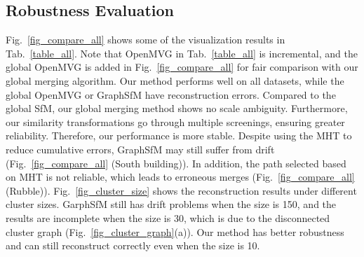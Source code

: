 \documentclass[runningheads]{llncs}
\begin{document}
 





\subsection{Robustness Evaluation}
Fig.~\ref{fig_compare_all} shows some of the visualization results in Tab.~\ref{table_all}. Note that OpenMVG in Tab.~\ref{table_all} is incremental, and the global OpenMVG is added in Fig.~\ref{fig_compare_all} for fair comparison with our global merging algorithm. Our method performs well on all datasets, while the global OpenMVG or GraphSfM have reconstruction errors. Compared to the global SfM, our global merging method shows no scale ambiguity. Furthermore, our similarity transformations go through multiple screenings, ensuring greater reliability. Therefore, our performance is more stable. Despite using the MHT to reduce cumulative errors, GraphSfM may still suffer from drift (Fig.~\ref{fig_compare_all} (South building)). In addition, the path selected based on MHT is not reliable, which leads to erroneous merges (Fig.~\ref{fig_compare_all} (Rubble)). Fig.~\ref{fig_cluster_size} shows the reconstruction results under different cluster sizes. GarphSfM still has drift problems when the size is 150, and the results are incomplete when the size is 30, which is due to the disconnected cluster graph (Fig.~\ref{fig_cluster_graph}(a)). Our method has better robustness and can still reconstruct correctly even when the size is 10.
\end{document}
